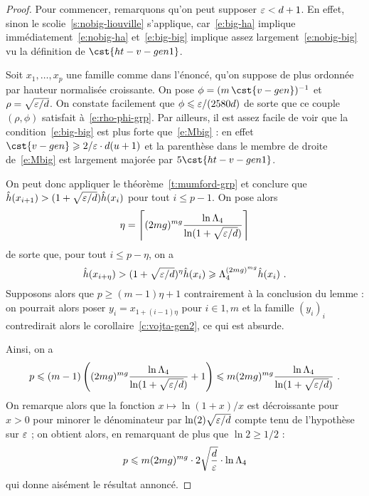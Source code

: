 \begin{proof}
  Pour commencer, remarquons qu'on peut supposer \( \varepsilon < d + 1 \). En
  effet, sinon le scolie~\vref{s:nobig-liouville} s'applique,
  car~\eqref{e:big-ha} implique immédiatement~\eqref{e:nobig-ha}
  et~\eqref{e:big-big} implique assez largement~\eqref{e:nobig-big} vu la
  définition de \( \cst{ht-v-gen1} \).

  Soit \( x_1, \dots, x_p \) une famille comme dans l'énoncé, qu'on suppose de
  plus ordonnée par hauteur normalisée croissante. On pose
  \( \phi =( m \, \cst{v-gen})^{-1} \) et
  \( \rho = \sqrt{ \varepsilon / d } \).  On constate facilement que
  \( \phi \leqslant \varepsilon / (2580 d) \) de sorte que ce couple \( (\rho, \phi) \)
  satisfait à~\eqref{e:rho-phi-grp}. Par ailleurs, il est assez facile de voir
  que la condition~\eqref{e:big-big} est plus forte que~\eqref{e:Mbig} : en
  effet \( \cst{v-gen} \ge 2/\eps \cdot \adeg (\adim+1) \) et la parenthèse
  dans le membre de droite de~\eqref{e:Mbig} est largement majorée par \( 5
    \cst{ht-v-gen1} \).

  On peut donc appliquer le théorème~\vref{t:mumford-grp} et conclure que
  \( \hat h ( x_{i+1} ) > (1 + \sqrt{\varepsilon / d}) \hat h ( x_i ) \) pour tout
  \( i \le p-1 \). On pose alors
  \begin{equation}
    \eta
    =
    \left\lceil
      (2mg)^{mg}
      \frac{ \ln \Lambda_4 }{ \ln (1 + \sqrt{\varepsilon / d}) }
    \right\rceil
  \end{equation}
  de sorte que, pour tout \( i \le p - \eta \), on a
  \begin{equation}
    \hat h ( x_{i+\eta} )
    >
    (1 + \sqrt{\varepsilon / d})^\eta
    \hat h ( x_i )
    \geqslant
    \Lambda_4^{(2mg)^{mg}}
    \hat h ( x_i )
    \text{ .}
  \end{equation}
  Supposons alors que \( p \ge (m - 1) \eta + 1 \) contrairement à la
  conclusion du lemme : on pourrait alors poser \( y_i = x_{1 + (i-1)
      \eta} \) pour \( i \in {1, m} \) et la famille \( (y_i)_i \)
  contredirait alors le corollaire~\vref{c:vojta-gen2}, ce qui est absurde.

  Ainsi, on a
  \begin{equation}
    p
    \leqslant
    (m - 1)
    \left(
      (2mg)^{mg}
      \frac{ \ln \Lambda_4 }{ \ln (1 + \sqrt{\varepsilon / d}) }
      + 1
    \right)
    \leqslant
    m
    (2mg)^{mg}
    \frac{ \ln \Lambda_4 }{ \ln (1 + \sqrt{\varepsilon / d}) }
    \text{ .}
  \end{equation}
  On remarque alors que la fonction \( x \mapsto \ln(1+x)/x \) est
  décroissante pour \( x > 0 \) pour minorer le dénominateur par \( \ln(2)
    \sqrt{\varepsilon / d} \) compte tenu de l'hypothèse sur \( \varepsilon \) ; on
  obtient alors, en remarquant de plus que \( \ln 2 \ge 1/2 \) :
  \begin{equation}
    p
    \leqslant
    m (2mg)^{mg}
    \cdot 2 \sqrt{\frac {d} {\varepsilon}}
    \cdot \ln \Lambda_4
  \end{equation}
  qui donne aisément le résultat annoncé.
\end{proof}

